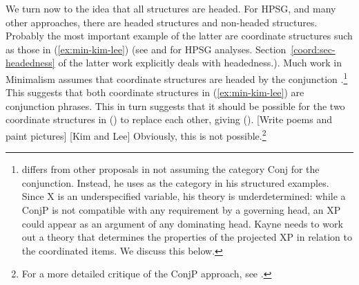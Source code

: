 \documentclass[output=paper
 	        ,biblatex
                ,babelshorthands
                ,newtxmath
                ,draftmode
                ,colorlinks, citecolor=brown
]{langscibook}
\begin{document}
We turn now to the idea that all structures are headed. For HPSG, and many other approaches, there
are headed structures and non-headed structures. Probably the most important example of the latter
are coordinate structures such as those in (\ref{ex:min-kim-lee}) (see \citealt{Sag2003a-u} and
 for HPSG analyses. Section~\ref{coord:sec-headedness} of
the latter work explicitly deals with headedness.).
\label{ex:min-kim-lee}
\z
Much work in Minimalism assumes that coordinate structures are headed by the conjunction
\parencites[]{Larson90a-u}[]{Radford93a-u}[Chapter~6]{Kayne94a-u}[]{Johannessen98a-u}[]{vanKoppen2005a-u}[]{Boskovic2009a-u}[]{Citko2011a-u}.\footnote{
  \citet[]{Kayne94a-u} differs from other proposals in not assuming the category Conj for
  the conjunction. Instead, he uses \xnull as the category in his structured examples. Since X is an
  underspecified variable, his theory is underdetermined: while a ConjP is not compatible with any
  requirement by a governing head, an XP could appear as an argument of any dominating head. Kayne
  needs to work out a theory that determines the properties of the projected XP in relation to
  the coordinated items. We discuss this below.
}
This suggests that both coordinate structures in (\ref{ex:min-kim-lee}) are conjunction phrases. 
This in turn suggests that it should be possible for the two coordinate structures in () to replace each other, giving ().
\ea
{}[Write poems and paint pictures] [Kim and Lee]
\z
Obviously, this is not possible.\footnote{%
For a more detailed critique of the ConjP approach, see \citet{Borsley2005a}.%
}
\end{document}
